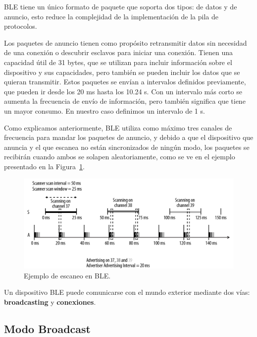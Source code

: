 BLE tiene un único formato de paquete que soporta dos tipos: de datos y de anuncio, esto reduce la complejidad de la implementación de la pila de protocolos.

Los paquetes de anuncio tienen como propósito retransmitir datos sin necesidad de una conexión o descubrir esclavos para iniciar una conexión.  Tienen una capacidad útil de 31 bytes, que se utilizan para incluir información sobre el dispositivo y sus capacidades, pero también se pueden incluir los datos que se quieran transmitir. Estos paquetes se envían a intervalos definidos previamente, que pueden ir desde los 20 ms hasta los 10.24 s. Con un intervalo más corto se aumenta la frecuencia de envío de información, pero también significa que tiene un mayor consumo. En nuestro caso definimos un intervalo de 1 s.

Como explicamos anteriormente, BLE utiliza como máximo tres canales de frecuencia para mandar los paquetes de anuncio, y debido a que el dispositivo que anuncia y el que escanea no están sincronizados de ningún modo, los paquetes se recibirán cuando ambos se solapen aleatoriamente, como se ve en el ejemplo presentado en la Figura~\ref{figuraBLEScan}.

\begin{figure}[h]%
	\centering
    \includegraphics[width=\linewidth]{figures/ble_scan_example.png} %
    \caption[Ejemplo de escaneo BLE]{Ejemplo de escaneo en BLE.}
   	\label{figuraBLEScan}
\end{figure}

Un dispositivo BLE puede comunicarse con el mundo exterior mediante dos vías: \textbf{broadcasting} y \textbf{conexiones}.

\subsection{Modo Broadcast}
\label{makereference2.3.1}

